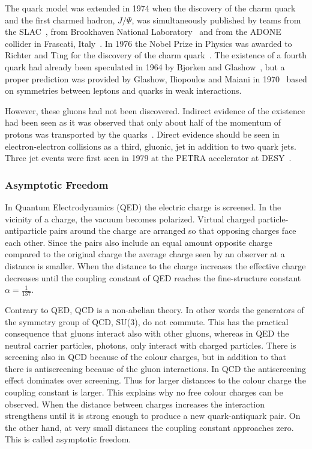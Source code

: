 
The quark model was extended in 1974 when the discovery of the charm quark and the first charmed hadron, $J/\Psi$, was simultaneously published by teams from the SLAC~\cite{Augustin:1974xw}, from Brookhaven National Laboratory~\cite{Aubert:1974js} and from the ADONE collider in Frascati, Italy~\cite{Bacci:1974za}. In 1976 the Nobel Prize in Physics was awarded to Richter and Ting for the discovery of the charm quark~\cite{Nobel1976}. The existence of a fourth quark had already been speculated in 1964 by Bjorken and Glashow~\cite{Bjorken:1964gz}, but a proper prediction was provided by Glashow, Iliopoulos and Maiani in 1970~\cite{Glashow:1970gm} based on symmetries between leptons and quarks in weak interactions.

However, these gluons had not been discovered. Indirect evidence of the existence had been seen as it was observed that only about half of the momentum of protons was transported by the quarks~\cite{25gluons}. Direct evidence should be seen in electron-electron collisions as a third, gluonic, jet in addition to two quark jets. Three jet events were first seen in 1979 at the PETRA accelerator at DESY~\cite{Brandelik1979243, PhysRev.43.830, Berger1979418}.



\subsubsection{Asymptotic Freedom}
In Quantum Electrodynamics (QED) the electric charge is screened. In the vicinity of a charge, the vacuum becomes polarized. Virtual charged particle-antiparticle pairs around the charge are arranged so that opposing charges face each other. Since the pairs also include an equal amount opposite charge compared to the original charge the average charge seen by an observer at a distance is smaller. When the distance to the charge increases the effective charge decreases until the coupling constant of QED reaches the fine-structure constant $\alpha=\frac{1}{137}$.~\cite{Perkins:1982xb}

Contrary to QED, QCD is a non-abelian theory. In other words the generators of the symmetry group of QCD, SU(3), do not commute. This has the practical consequence that gluons interact also with other gluons, whereas in QED the neutral carrier particles, photons, only interact with charged particles.
There is screening also in QCD because of the colour charges, but in addition to that there is antiscreening because of the gluon interactions. In QCD the antiscreening effect dominates over screening. Thus for larger distances to the colour charge the coupling constant is larger. This explains why no free colour charges can be observed. When the distance between charges increases the interaction strengthens until it is strong enough to produce a new quark-antiquark pair. On the other hand, at very small distances the coupling constant approaches zero. This is called asymptotic freedom.~\cite{Perkins:1982xb}

